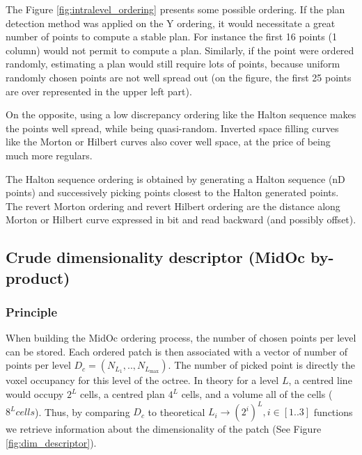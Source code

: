 		The Figure \ref{fig:intralevel_ordering} presents some possible ordering. 
		If the plan detection method was applied on the Y ordering, it would necessitate a great number of points to compute a stable plan. For instance the first 16 points (1 column) would not permit to compute a plan.
		Similarly, if the point were ordered randomly, estimating a plan would still require lots of points, because uniform randomly chosen points are not well spread out (on the figure, the first 25 points are over represented in the upper left part).
		
		On the opposite, using a low discrepancy ordering like the Halton sequence makes the points well spread, while being quasi-random.
		Inverted space filling curves like the Morton or Hilbert curves also cover well space, at the price of being much more regulars.
		
		The Halton sequence ordering is obtained by generating a Halton sequence (nD points) and successively picking points closest to the Halton generated points.
		The revert Morton ordering and revert Hilbert ordering are the distance along Morton or Hilbert curve expressed in bit and read backward (and possibly offset).
		 
				
	\subsection{Crude dimensionality descriptor (MidOc by-product)} 
		\label{method.dimdescriptor}
		\subsubsection{Principle}
		When building the MidOc ordering process, the number of chosen points per level can be stored.
		Each ordered patch is then associated with a vector of number of points per level $D_c=(N_{L_{1}},..,N_{L_{\text{max}}})$.
		The number of picked point is directly the voxel occupancy for this level of the octree.
		In theory for a level $L$, a centred line would occupy $2^L$ cells, a centred plan $4^L$ cells, and a volume all of the cells ($8^L cells$).
		Thus, by comparing $D_c$ to theoretical $L_i  \rightarrow (2^i)^L,i \in [1..3]$ functions we retrieve information about the dimensionality of the patch (See Figure \ref{fig:dim_descriptor}). 
		
